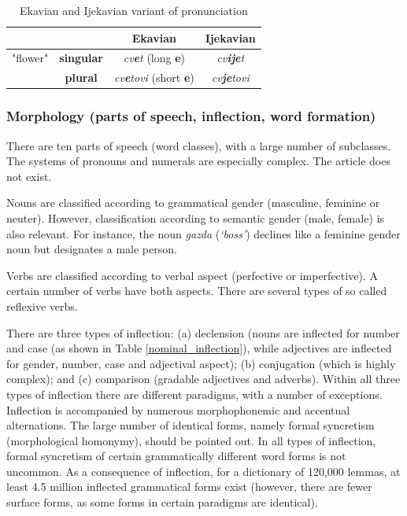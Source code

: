 \begin{multicols}{2}
\begin{table}[ht]
\begin{center}
\begin{tabular}{|c|c|c|c|}
 \hline
  \multicolumn{2}{|c|}{} & {\textbf{Ekavian}} & {\textbf{Ijekavian}} \\ 
   \hline
  {"flower"} & \textbf{singular} & \textit{cv\textbf{e}t} (long \textbf{e}) & \textit{cv\textbf{ije}t}\\ 
   \cline{2-4}
     & \textbf{plural} & \textit{cv\textbf{e}tovi} (short \textbf{e}) & \textit{cv\textbf{je}tovi} \\
  \hline
 \end{tabular}
\end{center}
\caption{Ekavian and Ijekavian variant of pronunciation}
\label{ekavian_and_ijekavian}
\end{table}


\subsubsection {Morphology (parts of speech, inflection, word formation)}

There are ten parts of speech (word classes), with a large number of subclasses. The systems of pronouns and numerals are especially complex. The article does not exist.

Nouns are classified according to grammatical gender (masculine, feminine or neuter). However, classification according to semantic gender (male, female) is also relevant. For instance, the noun \textit{gazda} (\textit{‘boss’}) declines like a feminine gender noun but designates a male person.  

Verbs are classified according to verbal aspect (perfective or imperfective). A certain number of verbs have both aspects. There are several types of so called reflexive verbs.

There are three types of inflection: (a) declension (nouns are inflected for number and case (as shown in Table \ref{nominal_inflection}), while adjectives are inflected for gender, number, case and adjectival aspect); (b) conjugation (which is highly complex); and (c) comparison (gradable adjectives and adverbs). Within all three types of inflection there are different paradigms, with a number of exceptions. Inflection is accompanied by numerous morphophonemic and accentual alternations. The large number of identical forms, namely formal syncretism (morphological homonymy), should be pointed out. In all types of inflection, formal syncretism of certain grammatically different word forms is not uncommon. As a consequence of inflection, for a dictionary of 120,000 lemmas, at least 4.5 million inflected grammatical forms exist (however, there are fewer surface forms, as some forms in certain paradigms are identical).


\end{multicols}
